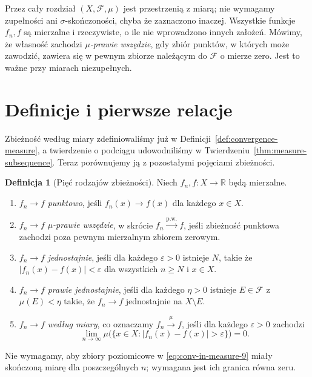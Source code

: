 \documentclass[11pt,a4paper,oneside]{book}
\numberwithin{equation}{chapter}
\theoremstyle{plain}
\theoremstyle{definition}
\newtheorem{definicja}[twierdzenie]{Definicja}
\theoremstyle{remark}
\begin{document}
Przez cały rozdział $(X,\mathcal F,\mu)$ jest przestrzenią
z miarą; nie wymagamy zupełności ani $\sigma$-skończoności, chyba
że zaznaczono inaczej. Wszystkie funkcje $f_n,f$ są mierzalne i
rzeczywiste, o ile nie wprowadzono innych założeń. Mówimy, że
własność zachodzi \emph{$\mu$-prawie wszędzie}, gdy zbiór punktów,
w których może zawodzić, zawiera się w pewnym zbiorze należącym
do $\mathcal F$ o mierze zero. Jest to ważne przy miarach
niezupełnych.

\section{Definicje i pierwsze relacje}

Zbieżność według miary zdefiniowaliśmy już w
Definicji~\ref{def:convergence-measure}, a twierdzenie o podciągu
udowodniliśmy w Twierdzeniu~\ref{thm:measure-subsequence}.
Teraz porównujemy ją z pozostałymi pojęciami zbieżności.


\begin{definicja}[Pięć rodzajów zbieżności]
\label{def:five-convergences}
Niech $f_n,f:X\to\mathbb R$ będą mierzalne.
\begin{enumerate}[label=\textup{(\roman*)}]
\item $f_n\to f$ \emph{punktowo}, jeśli
$f_n(x)\to f(x)$ dla każdego $x\in X$.
\item $f_n\to f$ \emph{$\mu$-prawie wszędzie}, w skrócie
$f_n\xrightarrow{\mathrm{p.w.}}f$, jeśli zbieżność
punktowa zachodzi poza pewnym mierzalnym zbiorem zerowym.
\item $f_n\to f$ \emph{jednostajnie}, jeśli dla każdego
$\varepsilon>0$ istnieje $N$, takie że
$|f_n(x)-f(x)|<\varepsilon$ dla wszystkich $n\ge N$
i $x\in X$.
\item $f_n\to f$ \emph{prawie jednostajnie}, jeśli dla każdego
$\eta>0$ istnieje $E\in\mathcal F$ z $\mu(E)<\eta$
takie, że $f_n\to f$ jednostajnie na $X\setminus E$.
\item $f_n\to f$ \emph{według miary}, co oznaczamy
$f_n\xrightarrow{\mu}f$, jeśli dla każdego $\varepsilon>0$
zachodzi
\begin{equation}\label{eq:conv-in-measure-9}
\lim_{n\to\infty}\mu\bigl(\{x\in X:
|f_n(x)-f(x)|>\varepsilon\}\bigr)=0.
\end{equation}
\end{enumerate}
Nie wymagamy, aby zbiory poziomicowe w
\eqref{eq:conv-in-measure-9} miały skończoną miarę dla
poszczególnych $n$; wymagana jest ich granica równa zeru.
\end{definicja}
\end{document}
